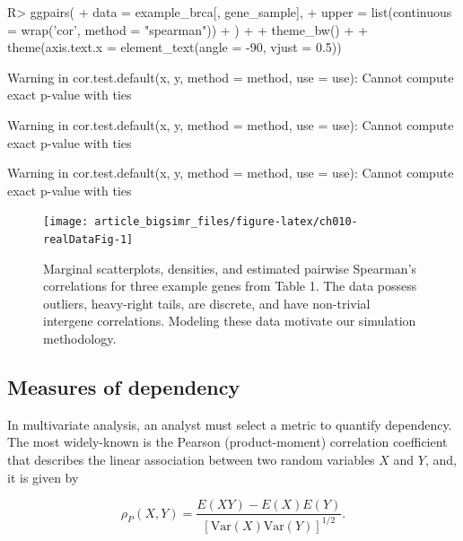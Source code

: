 \documentclass[
]{jss}
\begin{document}
\begin{CodeChunk}
\begin{CodeInput}
R> ggpairs(
+   data = example_brca[, gene_sample],
+   upper = list(continuous = wrap('cor', method = "spearman"))
+ ) + 
+   theme_bw() +
+   theme(axis.text.x = element_text(angle = -90, vjust = 0.5))
\end{CodeInput}
\begin{CodeOutput}
Warning in cor.test.default(x, y, method = method, use = use): Cannot compute
exact p-value with ties
\end{CodeOutput}
\begin{CodeOutput}
Warning in cor.test.default(x, y, method = method, use = use): Cannot compute
exact p-value with ties
\end{CodeOutput}
\begin{CodeOutput}
Warning in cor.test.default(x, y, method = method, use = use): Cannot compute
exact p-value with ties
\end{CodeOutput}
\begin{figure}

{\centering \texttt{[image: article\_bigsimr\_files/figure-latex/ch010-realDataFig-1]} 

}

\caption[Marginal scatterplots, densities, and estimated pairwise Spearman's correlations for three example genes from Table 1]{Marginal scatterplots, densities, and estimated pairwise Spearman's correlations for three example genes from Table 1. The data possess outliers, heavy-right tails, are discrete, and have non-trivial intergene correlations. Modeling these data motivate our simulation methodology.}\label{fig:ch010-realDataFig}
\end{figure}
\end{CodeChunk}

\hypertarget{measures-of-dependency}{%
\subsection{Measures of dependency}\label{measures-of-dependency}}

In multivariate analysis, an analyst must select a metric to quantify dependency.
The most widely-known is the Pearson (product-moment) correlation coefficient that describes the linear association between two random variables \(X\) and \(Y\), and, it is given by

\begin{equation}
\rho_P(X,Y) = \frac{E(XY) - E(X)E(Y)}{\left[ \mathrm{Var}(X)\mathrm{Var}(Y)\right]^{1/2}}.
\label{eq:pearson}
\end{equation}
\end{document}
